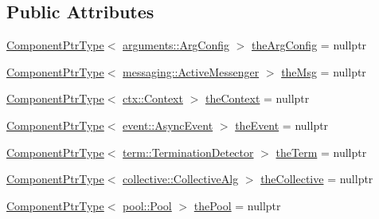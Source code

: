 \subsection*{Public Attributes}
\begin{DoxyCompactItemize}
\item 
\hyperlink{structvt_1_1runtime_1_1_runtime_a0893bf0a8c03b898e8ab66b52cec80ad}{Component\+Ptr\+Type}$<$ \hyperlink{structvt_1_1arguments_1_1_arg_config}{arguments\+::\+Arg\+Config} $>$ \hyperlink{structvt_1_1runtime_1_1_runtime_a30b262f43f826ffee213e10c71893323}{the\+Arg\+Config} = nullptr
\item 
\hyperlink{structvt_1_1runtime_1_1_runtime_a0893bf0a8c03b898e8ab66b52cec80ad}{Component\+Ptr\+Type}$<$ \hyperlink{structvt_1_1messaging_1_1_active_messenger}{messaging\+::\+Active\+Messenger} $>$ \hyperlink{structvt_1_1runtime_1_1_runtime_a8aad5f2fdd05ddd81995f5af94ce196e}{the\+Msg} = nullptr
\item 
\hyperlink{structvt_1_1runtime_1_1_runtime_a0893bf0a8c03b898e8ab66b52cec80ad}{Component\+Ptr\+Type}$<$ \hyperlink{structvt_1_1ctx_1_1_context}{ctx\+::\+Context} $>$ \hyperlink{structvt_1_1runtime_1_1_runtime_a572dac3bef0126b593a93b2c651efb7e}{the\+Context} = nullptr
\item 
\hyperlink{structvt_1_1runtime_1_1_runtime_a0893bf0a8c03b898e8ab66b52cec80ad}{Component\+Ptr\+Type}$<$ \hyperlink{structvt_1_1event_1_1_async_event}{event\+::\+Async\+Event} $>$ \hyperlink{structvt_1_1runtime_1_1_runtime_accfb27cbfaecafe834ade7cd6dc57d7b}{the\+Event} = nullptr
\item 
\hyperlink{structvt_1_1runtime_1_1_runtime_a0893bf0a8c03b898e8ab66b52cec80ad}{Component\+Ptr\+Type}$<$ \hyperlink{structvt_1_1term_1_1_termination_detector}{term\+::\+Termination\+Detector} $>$ \hyperlink{structvt_1_1runtime_1_1_runtime_a365e1addbed82440bb014f97b1c839f6}{the\+Term} = nullptr
\item 
\hyperlink{structvt_1_1runtime_1_1_runtime_a0893bf0a8c03b898e8ab66b52cec80ad}{Component\+Ptr\+Type}$<$ \hyperlink{structvt_1_1collective_1_1_collective_alg}{collective\+::\+Collective\+Alg} $>$ \hyperlink{structvt_1_1runtime_1_1_runtime_a52b4a07eacf90a576f077e193604eab9}{the\+Collective} = nullptr
\item 
\hyperlink{structvt_1_1runtime_1_1_runtime_a0893bf0a8c03b898e8ab66b52cec80ad}{Component\+Ptr\+Type}$<$ \hyperlink{structvt_1_1pool_1_1_pool}{pool\+::\+Pool} $>$ \hyperlink{structvt_1_1runtime_1_1_runtime_a060aca8399f1c6499c4676a26db2e39e}{the\+Pool} = nullptr
\item 

\end{DoxyCompactItemize}
